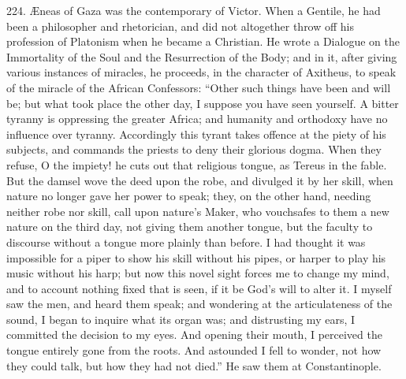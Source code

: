 224.
Æneas of Gaza was the contemporary of Victor. When a Gentile, he had
been a philosopher and rhetorician, and did not altogether throw off
his profession of Platonism when he became a Christian. He wrote a
Dialogue on the Immortality of the Soul and the Resurrection of the
Body; and in it, after giving various instances of miracles, he
proceeds, in the character of Axitheus, to speak of the miracle of the
African Confessors: ``Other such things have been and will be; but what
took place the other day, I suppose you have seen yourself. A bitter
tyranny is oppressing the greater Africa; and humanity and orthodoxy
have no influence over tyranny. Accordingly this tyrant takes offence
at the piety of his subjects, and commands the priests to deny their
glorious dogma. When they refuse, O the impiety! he cuts out
that religious tongue, as Tereus in the fable. But the damsel wove the
deed upon the robe, and divulged it by her skill, when nature no
longer gave her power to speak; they, on the other hand, needing
neither robe nor skill, call upon nature's Maker, who vouchsafes to
them a new nature on the third day, not giving them another tongue,
but the faculty to discourse without a tongue more plainly than
before. I had thought it was impossible for a piper to show his skill
without his pipes, or harper to play his music without his harp; but
now this novel sight forces me to change my mind, and to account
nothing fixed that is seen, if it be God's will to alter it. I myself
saw the men, and heard them speak; and wondering at the articulateness
of the sound, I began to inquire what its organ was; and distrusting
my ears, I committed the decision to my eyes. And opening their mouth,
I perceived the tongue entirely gone from the roots. And astounded I
fell to wonder, not how they could talk, but how they had not died.''
He saw them at Constantinople.

